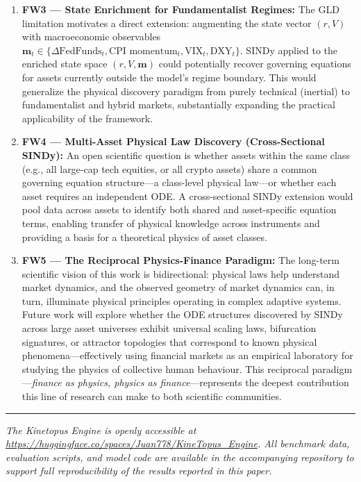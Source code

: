\documentclass[11pt,a4paper]{article}
\begin{document}
\begin{enumerate}[leftmargin=1.5em]
    \item \textbf{FW3 --- State Enrichment for Fundamentalist Regimes:} The GLD limitation motivates a direct extension: augmenting the state vector $(r, V)$ with macroeconomic observables $\mathbf{m}_t \in \{\Delta\text{FedFunds}_t, \text{CPI momentum}_t, \text{VIX}_t, \text{DXY}_t\}$. SINDy applied to the enriched state space $(r, V, \mathbf{m})$ could potentially recover governing equations for assets currently outside the model's regime boundary. This would generalize the physical discovery paradigm from purely technical (inertial) to fundamentalist and hybrid markets, substantially expanding the practical applicability of the framework.
    \item \textbf{FW4 --- Multi-Asset Physical Law Discovery (Cross-Sectional SINDy):} An open scientific question is whether assets within the same class (e.g., all large-cap tech equities, or all crypto assets) share a common governing equation structure---a class-level physical law---or whether each asset requires an independent ODE. A cross-sectional SINDy extension would pool data across assets to identify both shared and asset-specific equation terms, enabling transfer of physical knowledge across instruments and providing a basis for a theoretical physics of asset classes.
    \item \textbf{FW5 --- The Reciprocal Physics-Finance Paradigm:} The long-term scientific vision of this work is bidirectional: physical laws help understand market dynamics, and the observed geometry of market dynamics can, in turn, illuminate physical principles operating in complex adaptive systems. Future work will explore whether the ODE structures discovered by SINDy across large asset universes exhibit universal scaling laws, bifurcation signatures, or attractor topologies that correspond to known physical phenomena---effectively using financial markets as an empirical laboratory for studying the physics of collective human behaviour. This reciprocal paradigm---\textit{finance as physics, physics as finance}---represents the deepest contribution this line of research can make to both scientific communities.
\end{enumerate}

\vspace{1em}
\noindent\rule{\linewidth}{0.4pt}
\vspace{0.5em}
\noindent\textit{The Kinetopus Engine is openly accessible at \url{https://huggingface.co/spaces/Juan778/KineTopus_Engine}. All benchmark data, evaluation scripts, and model code are available in the accompanying repository to support full reproducibility of the results reported in this paper.}
\end{document}
